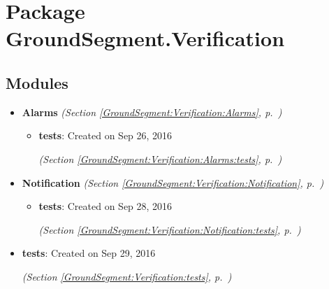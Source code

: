 %
%
%


\section{Package GroundSegment.Verification}

    \label{GroundSegment:Verification}


\subsection{Modules}

\begin{itemize}
\setlength{\parskip}{0ex}
\item \textbf{Alarms}
  \textit{(Section \ref{GroundSegment:Verification:Alarms}, p.~\pageref{GroundSegment:Verification:Alarms})}

  \begin{itemize}
\setlength{\parskip}{0ex}
    \item \textbf{tests}: Created on Sep 26, 2016



  \textit{(Section \ref{GroundSegment:Verification:Alarms:tests}, p.~\pageref{GroundSegment:Verification:Alarms:tests})}

  \end{itemize}
\item \textbf{Notification}
  \textit{(Section \ref{GroundSegment:Verification:Notification}, p.~\pageref{GroundSegment:Verification:Notification})}

  \begin{itemize}
\setlength{\parskip}{0ex}
    \item \textbf{tests}: Created on Sep 28, 2016



  \textit{(Section \ref{GroundSegment:Verification:Notification:tests}, p.~\pageref{GroundSegment:Verification:Notification:tests})}

  \end{itemize}
\item \textbf{tests}: Created on Sep 29, 2016



  \textit{(Section \ref{GroundSegment:Verification:tests}, p.~\pageref{GroundSegment:Verification:tests})}

\end{itemize}


